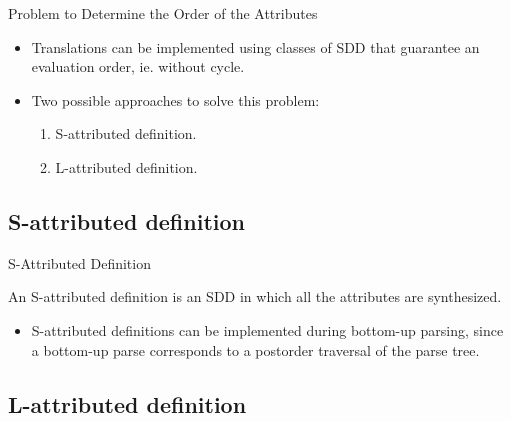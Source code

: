 \begin{bibunit}[apalike]
\begin{frame}{Problem to Determine the Order of the Attributes}
	\vfill
	\vfill
	\begin{itemize}
	\item Translations can be implemented using classes of SDD that guarantee an evaluation order, ie. without cycle.
	\vfill
	\item Two possible approaches to solve this problem:
		\begin{enumerate}
		\item  S-attributed definition.
		\item L-attributed definition.
		\end{enumerate}
	\end{itemize}
\end{frame}

\subsection{S-attributed definition}

\tableofcontentslide[sections={1-4},sectionstyle={show/shaded},subsectionstyle={show/shaded/hide},subsubsectionstyle={show/show/hide/hide}]

\begin{frame}{S-Attributed Definition}
	\begin{definition}
		An S-attributed definition is an SDD in which all the attributes are synthesized.
	\end{definition}
	\vspace{4em}
	\begin{itemize}
	\item S-attributed definitions can be implemented during bottom-up parsing, since a bottom-up parse corresponds to a postorder traversal of the parse tree.
	\end{itemize}
\end{frame}

\subsection{L-attributed definition}

\tableofcontentslide[sections={1-4},sectionstyle={show/shaded},subsectionstyle={show/shaded/hide},subsubsectionstyle={show/show/hide/hide}]


\end{bibunit}
